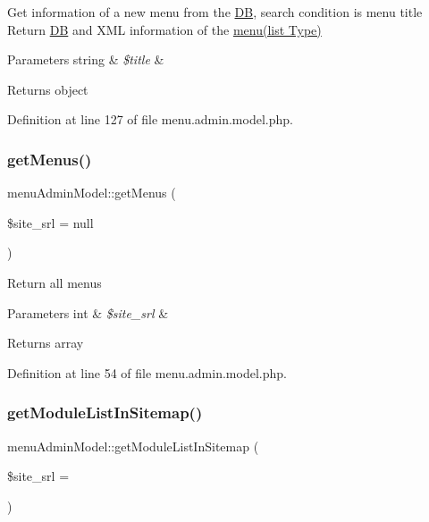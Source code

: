 Get information of a new menu from the \hyperlink{classDB}{DB}, search condition is menu title Return \hyperlink{classDB}{DB} and X\+ML information of the \hyperlink{classmenu}{menu(list Type)} 
\begin{DoxyParams}[1]{Parameters}
string & {\em \$title} & \\
\hline
\end{DoxyParams}
\begin{DoxyReturn}{Returns}
object 
\end{DoxyReturn}


Definition at line 127 of file menu.\+admin.\+model.\+php.

\mbox{\label{classmenuAdminModel_a78dfe866b68c04fd622df4d41bdce36c}} 
\subsubsection{\texorpdfstring{get\+Menus()}{getMenus()}}
{\footnotesize\ttfamily menu\+Admin\+Model\+::get\+Menus (\begin{DoxyParamCaption}\item[{}]{\$site\+\_\+srl = {\ttfamily null} }\end{DoxyParamCaption})}

Return all menus 
\begin{DoxyParams}[1]{Parameters}
int & {\em \$site\+\_\+srl} & \\
\hline
\end{DoxyParams}
\begin{DoxyReturn}{Returns}
array 
\end{DoxyReturn}


Definition at line 54 of file menu.\+admin.\+model.\+php.

\mbox{\label{classmenuAdminModel_a20137764f7bc81d8413f7adc0518d895}} 
\subsubsection{\texorpdfstring{get\+Module\+List\+In\+Sitemap()}{getModuleListInSitemap()}}
{\footnotesize\ttfamily menu\+Admin\+Model\+::get\+Module\+List\+In\+Sitemap (\begin{DoxyParamCaption}\item[{}]{\$site\+\_\+srl = {} }\end{DoxyParamCaption})}



